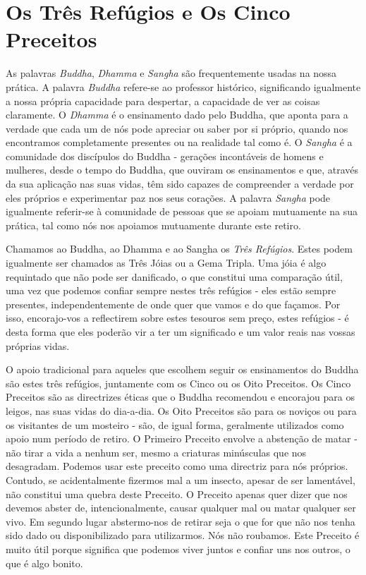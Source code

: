 \chapter{Os Três Refúgios e Os Cinco Preceitos}

As palavras \emph{Buddha}, \emph{Dhamma} e \emph{Sangha} são
frequentemente usadas na nossa prática. A palavra \emph{Buddha}
refere-se ao professor histórico, significando igualmente a nossa
própria capacidade para despertar, a capacidade de ver as coisas
claramente. O \emph{Dhamma} é o ensinamento dado pelo Buddha, que aponta
para a verdade que cada um de nós pode apreciar ou saber por si próprio,
quando nos encontramos completamente presentes ou na realidade tal como
é. O \emph{Sangha} é a comunidade dos discípulos do Buddha - gerações
incontáveis de homens e mulheres, desde o tempo do Buddha, que ouviram
os ensinamentos e que, através da sua aplicação nas suas vidas, têm sido
capazes de compreender a verdade por eles próprios e experimentar paz
nos seus corações. A palavra \emph{Sangha} pode igualmente referir-se à
comunidade de pessoas que se apoiam mutuamente na sua prática, tal como
nós nos apoiamos mutuamente durante este retiro.

Chamamos ao Buddha, ao Dhamma e ao Sangha os \emph{Três Refúgios}. Estes
podem igualmente ser chamados as Três Jóias ou a Gema Tripla. Uma jóia é
algo requintado que não pode ser danificado, o que constitui uma
comparação útil, uma vez que podemos confiar sempre nestes três refúgios
- eles estão sempre presentes, independentemente de onde quer que vamos
e do que façamos. Por isso, encorajo-vos a reflectirem sobre estes
tesouros sem preço, estes refúgios - é desta forma que eles poderão vir
a ter um significado e um valor reais nas vossas próprias vidas.

O apoio tradicional para aqueles que escolhem seguir os ensinamentos do
Buddha são estes três refúgios, juntamente com os Cinco ou os Oito
Preceitos. Os Cinco Preceitos são as directrizes éticas que o Buddha
recomendou e encorajou para os leigos, nas suas vidas do dia-a-dia. Os
Oito Preceitos são para os noviços ou para os visitantes de um mosteiro
- são, de igual forma, geralmente utilizados como apoio num período de
retiro. O Primeiro Preceito envolve a abstenção de matar - não tirar a
vida a nenhum ser, mesmo a criaturas minúsculas que nos desagradam.
Podemos usar este preceito como uma directriz para nós próprios.
Contudo, se acidentalmente fizermos mal a um insecto, apesar de ser
lamentável, não constitui uma quebra deste Preceito. O Preceito apenas
quer dizer que nos devemos abster de, intencionalmente, causar qualquer
mal ou matar qualquer ser vivo. Em segundo lugar abstermo-nos de retirar
seja o que for que não nos tenha sido dado ou disponibilizado para
utilizarmos. Nós não roubamos. Este Preceito é muito útil porque
significa que podemos viver juntos e confiar uns nos outros, o que é
algo bonito.

